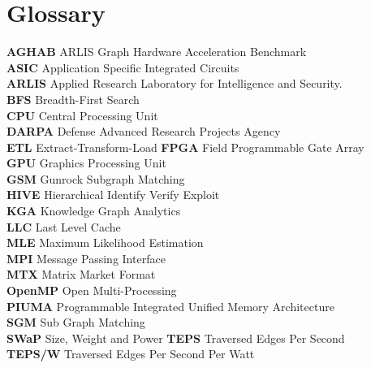 \section{Glossary}
\small{
\textbf{AGHAB} ARLIS Graph Hardware Acceleration Benchmark \\
\textbf{ASIC} Application Specific Integrated Circuits \\
\textbf{ARLIS} Applied Research Laboratory for Intelligence and Security.\\ 
\textbf{BFS} Breadth-First Search \\
\textbf{CPU} Central Processing Unit \\
\textbf{DARPA} Defense Advanced Research Projects Agency \\ 
\textbf{ETL} Extract-Transform-Load
\textbf{FPGA} Field Programmable Gate Array \\
\textbf{GPU} Graphics Processing Unit \\
\textbf{GSM} Gunrock Subgraph Matching \\
\textbf{HIVE} Hierarchical Identify Verify Exploit \\
\textbf{KGA} Knowledge Graph Analytics \\
\textbf{LLC} Last Level Cache \\ 
\textbf{MLE} Maximum Likelihood Estimation \\
\textbf{MPI} Message Passing Interface \\
\textbf{MTX} Matrix Market Format \\ 
\textbf{OpenMP} Open Multi-Processing \\
\textbf{PIUMA} Programmable Integrated Unified Memory Architecture \\ 
\textbf{SGM} Sub Graph Matching \\
\textbf{SWaP} Size, Weight and Power
\textbf{TEPS} Traversed Edges Per Second \\
\textbf{TEPS/W} Traversed Edges Per Second Per Watt
}